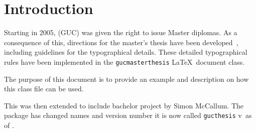 \chapter{Introduction}
\label{chap:introduction}

Starting in 2005, \GUC (GUC) was given the
right to issue Master diplomas. As a consequence of this, directions
for the master's thesis have been developed~\cite{GUCMaster},
including guidelines for the typographical details. These detailed
typographical rules have been implemented in the
\texttt{gucmasterthesis} \LaTeX\ document class.


The purpose of this document is to provide an example and description
on how this class file can be used.


This was then extended to include bachelor project by Simon McCallum.
The package has changed names and version number it is now called
\texttt{gucthesis}
v\gucthesisversion\ as of \gucthesisdate.
